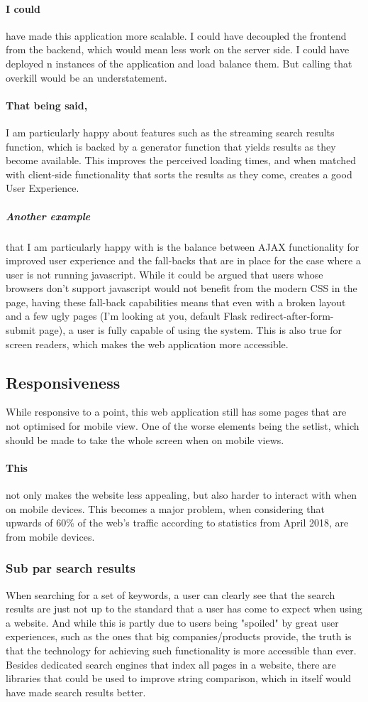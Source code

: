\documentclass[10pt, a4paper]{article}
\begin{document}
	\paragraph{I could} have made this application more scalable. I could have decoupled the frontend from the backend, which would mean less work on the server side. I could have deployed n instances of the application and load balance them. But calling that overkill would be an understatement.
	\paragraph{That being said,} I am particularly happy about features such as the streaming search results function, which is backed by a generator function that yields results as they become available. This improves the perceived loading times, and when matched with client-side functionality that sorts the results as they come, creates a good User Experience.
	\subparagraph{Another example} that I am particularly happy with is the balance between AJAX functionality for improved user experience and the fall-backs that are in place for the case where a user is not running javascript. While it could be argued that users whose browsers don't support javascript would not benefit from the modern CSS in the page, having these fall-back capabilities means that even with a broken layout and a few ugly pages (I'm looking at you, default Flask redirect-after-form-submit page), a user is fully capable of using the system. This is also true for screen readers, which makes the web application more accessible.
	
	\subsection{Responsiveness}
	While responsive to a point, this web application still has some pages that are not optimised for mobile view.
	One of the worse elements being the setlist, which should be made to take the whole screen when on mobile views.
	\paragraph{This} not only makes the website less appealing, but also harder to interact with when on mobile devices. This becomes a major problem, when considering that upwards of 60\% of the web's traffic according to statistics from April 2018, are from mobile devices\cite{Enge_2018}.
	
	\subsubsection{Sub par search results}
	When searching for a set of keywords, a user can clearly see that the search results are just not up to the standard that a user has come to expect when using a website. And while this is partly due to users being "spoiled" by great user experiences, such as the ones that big companies/products provide, the truth is that the technology for achieving such functionality is more accessible than ever. Besides dedicated search engines that index all pages in a website, there are libraries that could be used to improve string comparison, which in itself would have made search results better.
\end{document}
